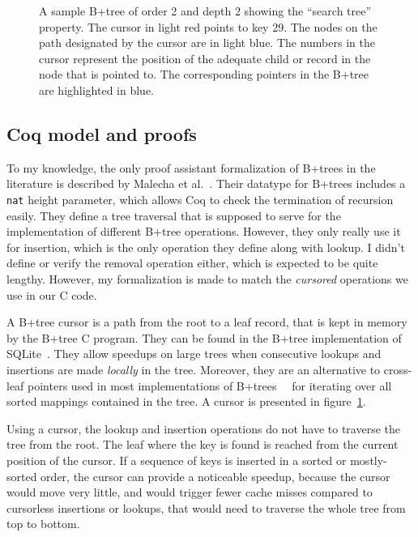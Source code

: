 \documentclass[11pt]{article}
\def\coqe{\lstinline[language=Coq, basicstyle=\small]}
\begin{document}
\begin{figure}
\caption{A sample B+tree of order 2 and depth 2 showing the ``search tree'' property.
The cursor in light red points to key 29. The nodes on the path designated by the cursor are in light blue.
The numbers in the cursor represent the position of the adequate child or record in the node that is pointed to. The corresponding pointers in the B+tree are highlighted in blue.}
\label{bptree}
\end{figure}

\subsection{Coq model and proofs}

To my knowledge, the only proof assistant formalization of B+trees in the literature is described by Malecha et al.~\cite{TVRDMS}.
Their datatype for B+trees includes a \coqe{nat} height parameter, which allows Coq to check the termination of recursion easily.
They define a tree traversal that is supposed to serve for the implementation of different B+tree operations.
However, they only really use it for insertion, which is the only operation they define along with lookup.
I didn't define or verify the removal operation either, which is expected to be quite lengthy.
However, my formalization is made to match the \emph{cursored} operations we use in our C code.

A B+tree cursor is a path from the root to a leaf record, that is kept in memory by the B+tree C program.
They can be found in the B+tree implementation of SQLite~\cite{DGS}.
They allow speedups on large trees when consecutive lookups and insertions are made \emph{locally} in the tree.
Moreover, they are an alternative to cross-leaf pointers used in most implementations of B+trees~\cite{TVRDMS}~\cite{DSCB} for iterating over all sorted mappings contained in the tree.
A cursor is presented in figure~\ref{bptree}.

Using a cursor, the lookup and insertion operations do not have to traverse the tree from the root.
The leaf where the key is found is reached from the current position of the cursor.
If a sequence of keys is inserted in a sorted or mostly-sorted order, the cursor can provide a noticeable speedup,
because the cursor would move very little, and would trigger fewer cache misses compared to cursorless insertions or lookups, that would need to traverse the whole tree from top to bottom.
\end{document}
